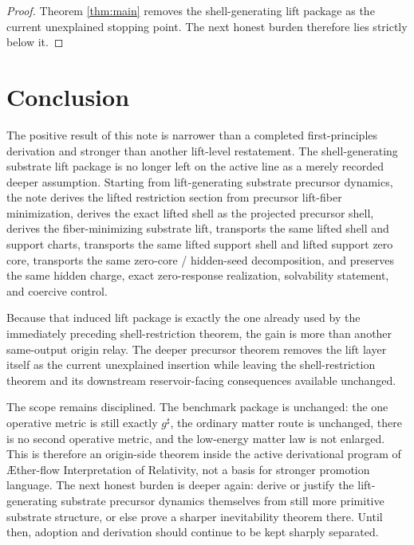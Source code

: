 \documentclass[11pt]{article}
\newcommand{\Aflow}{\AE{}ther-flow}
\newcommand{\TheoryName}{\Aflow{} Interpretation of Relativity}
\newcommand{\CompletedMetric}{g^{\sharp}}
\begin{document}
\begin{proof}
Theorem \ref{thm:main} removes the shell-generating lift package as the current unexplained stopping point. The next honest burden therefore lies strictly below it.
\end{proof}

\section{Conclusion}

The positive result of this note is narrower than a completed first-principles derivation and stronger than another lift-level restatement. The shell-generating substrate lift package is no longer left on the active line as a merely recorded deeper assumption. Starting from lift-generating substrate precursor dynamics, the note derives the lifted restriction section from precursor lift-fiber minimization, derives the exact lifted shell as the projected precursor shell, derives the fiber-minimizing substrate lift, transports the same lifted shell and support charts, transports the same lifted support shell and lifted support zero core, transports the same zero-core / hidden-seed decomposition, and preserves the same hidden charge, exact zero-response realization, solvability statement, and coercive control.

Because that induced lift package is exactly the one already used by the immediately preceding shell-restriction theorem, the gain is more than another same-output origin relay. The deeper precursor theorem removes the lift layer itself as the current unexplained insertion while leaving the shell-restriction theorem and its downstream reservoir-facing consequences available unchanged.

The scope remains disciplined. The benchmark package is unchanged: the one operative metric is still exactly \(\CompletedMetric\), the ordinary matter route is unchanged, there is no second operative metric, and the low-energy matter law is not enlarged. This is therefore an origin-side theorem inside the active derivational program of \TheoryName{}, not a basis for stronger promotion language. The next honest burden is deeper again: derive or justify the lift-generating substrate precursor dynamics themselves from still more primitive substrate structure, or else prove a sharper inevitability theorem there. Until then, adoption and derivation should continue to be kept sharply separated.
\end{document}
